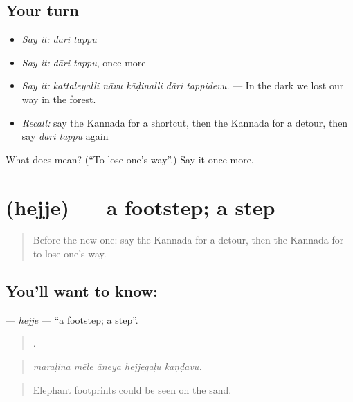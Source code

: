 \subsection*{Your turn}
\begin{itemize}
\raggedright
  \item \emph{Say it:} \emph{dāri tappu}
  \item \emph{Say it:} \emph{dāri tappu}, once more
  \item \emph{Say it:} \emph{kattaleyalli nāvu kāḍinalli dāri tappidevu.} — In the dark we lost our way in the forest.
  \item \emph{Recall:} say the Kannada for a shortcut, then the Kannada for a detour, then say \emph{dāri tappu} again
\end{itemize}

\begin{tcolorbox}[breakable,colback=teal!4,colframe=teal!35!black,title={Before you move on}]
What does   mean? (\textquotedblleft{}To lose one's way\textquotedblright{}.) Say it once more.
\end{tcolorbox}
\section[\texorpdfstring{\kn{ಹೆಜ್ಜೆ} (hejje)}{ಹೆಜ್ಜೆ (hejje)}]{ (hejje) — a footstep; a step}

\label{lesson:KA-C446-hejje}



\begin{quote}
Before the new one: say the Kannada for a detour, then the Kannada for to lose one's way.
\end{quote}

\subsection*{You'll want to know: }
\textbf{} — \emph{hejje} — \textquotedblleft{}a footstep; a step\textquotedblright{}.

\begin{quote}
    .
\end{quote}

\begin{quote}
\emph{maraḷina mēle āneya hejjegaḷu kaṇḍavu.}
\end{quote}

\begin{quote}
Elephant footprints could be seen on the sand.
\end{quote}

